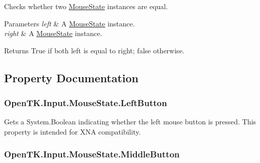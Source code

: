 Checks whether two \hyperlink{struct_open_t_k_1_1_input_1_1_mouse_state}{Mouse\-State} instances are equal. 


\begin{DoxyParams}{Parameters}
{\em left} & A \hyperlink{struct_open_t_k_1_1_input_1_1_mouse_state}{Mouse\-State} instance. \\
\hline
{\em right} & A \hyperlink{struct_open_t_k_1_1_input_1_1_mouse_state}{Mouse\-State} instance. \\
\hline
\end{DoxyParams}
\begin{DoxyReturn}{Returns}
True if both left is equal to right; false otherwise. 
\end{DoxyReturn}


\subsection{Property Documentation}
\hypertarget{struct_open_t_k_1_1_input_1_1_mouse_state_a025319a078dfbe9eb67ad930db990869}{
\subsubsection[{Left\-Button}]{ Open\-T\-K.\-Input.\-Mouse\-State.\-Left\-Button\hspace{0.3cm}{\ttfamily [get]}}}\label{struct_open_t_k_1_1_input_1_1_mouse_state_a025319a078dfbe9eb67ad930db990869}


Gets a System.\-Boolean indicating whether the left mouse button is pressed. This property is intended for X\-N\-A compatibility. 

\hypertarget{struct_open_t_k_1_1_input_1_1_mouse_state_a39c01ea816a799c76cb3fe572e72fb97}{
\subsubsection[{Middle\-Button}]{ Open\-T\-K.\-Input.\-Mouse\-State.\-Middle\-Button\hspace{0.3cm}{\ttfamily [get]}}}\label{struct_open_t_k_1_1_input_1_1_mouse_state_a39c01ea816a799c76cb3fe572e72fb97}


